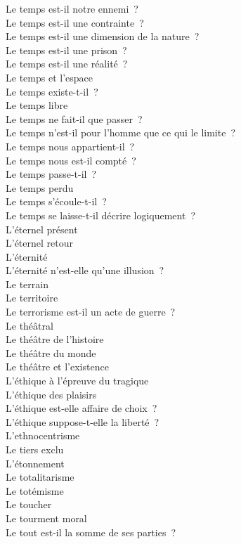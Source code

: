 \documentclass[a4paper,12pt]{article}
\begin{document}
Le temps est-il notre ennemi ? \\
Le temps est-il une contrainte ? \\
Le temps est-il une dimension de la nature ? \\
Le temps est-il une prison ? \\
Le temps est-il une réalité ? \\
Le temps et l'espace \\
Le temps existe-t-il ? \\
Le temps libre \\
Le temps ne fait-il que passer ? \\
Le temps n'est-il pour l'homme que ce qui le limite ? \\
Le temps nous appartient-il ? \\
Le temps nous est-il compté ? \\
Le temps passe-t-il ? \\
Le temps perdu \\
Le temps s'écoule-t-il ? \\
Le temps se laisse-t-il décrire logiquement ? \\
L'éternel présent \\
L'éternel retour \\
L'éternité \\
L'éternité n'est-elle qu'une illusion ? \\
Le terrain \\
Le territoire \\
Le terrorisme est-il un acte de guerre ? \\
Le théâtral \\
Le théâtre de l'histoire \\
Le théâtre du monde \\
Le théâtre et l'existence \\
L'éthique à l'épreuve du tragique \\
L'éthique des plaisirs \\
L'éthique est-elle affaire de choix ? \\
L'éthique suppose-t-elle la liberté ? \\
L'ethnocentrisme \\
Le tiers exclu \\
L'étonnement \\
Le totalitarisme \\
Le totémisme \\
Le toucher \\
Le tourment moral \\
Le tout est-il la somme de ses parties ? \\
\end{document}
